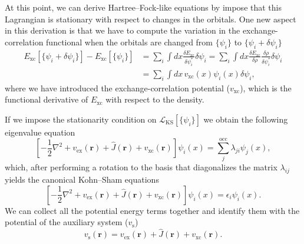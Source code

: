 \documentclass[../Main/chem532-notes.tex]{subfiles}
\begin{document}
At this point, we can derive Hartree--Fock-like equations by impose that this Lagrangian is stationary with respect to changes in the orbitals.
One new aspect in this derivation is that we have to compute the variation in the exchange-correlation functional when the orbitals are changed from $\{\psi_i\}$ to $\{\psi_i + \delta\psi_i \}$
\begin{equation}
\begin{split}
E_\mathrm{xc}[\{\psi_i + \delta\psi_i \}] - E_\mathrm{xc}[\{\psi_i\}]
& = \sum_i \int dx \frac{\delta E_\mathrm{xc}}{\delta\psi_i^* } \delta\psi_i 
= \sum_i \int dx \frac{\delta E_\mathrm{xc}}{\delta \rho} \frac{\delta \rho}{\delta\psi_i^* } \delta\psi_i  \\
& = \sum_i \int dx \, v_\mathrm{xc}(x) \psi_i(x)  \delta\psi_i,
\end{split}
\end{equation}
where we have introduced the exchange-correlation potential ($v_\mathrm{xc}$), which is the functional derivative of $E_\mathrm{xc}$ with respect to the density.

If we impose the stationarity condition on $\mathcal{L}_\mathrm{KS}[\{ \psi_i \}] $ we obtain the following eigenvalue equation
 \begin{equation}
\left[ -\frac{1}{2} \nabla^2 + v_\mathrm{ex}(\mathbf{r}) + \hat{J}(\mathbf{r}) + v_\mathrm{xc}(\mathbf{r}) \right] \psi_{i}(x) 
= \sum_{j}^\mathrm{occ} \lambda_{ji} \psi_{j}(x),
\end{equation}
which, after performing a rotation to the basis that diagonalizes the matrix $\lambda_{ij}$ yields the canonical Kohn--Sham equations
 \begin{equation}
\left[ -\frac{1}{2} \nabla^2 + v_\mathrm{ex}(\mathbf{r}) + \hat{J}(\mathbf{r}) + v_\mathrm{xc}(\mathbf{r}) \right] \psi_{i}(x) 
= \epsilon_{i} \psi_{i}(x).
\end{equation}
We can collect all the potential energy terms together and identify them with the potential of the auxiliary system ($v_\mathrm{s}$)
\begin{equation}
v_\mathrm{s}(\mathbf{r}) =  v_\mathrm{ex}(\mathbf{r}) + \hat{J}(\mathbf{r}) + v_\mathrm{xc}(\mathbf{r}).
\end{equation}
\end{document}
